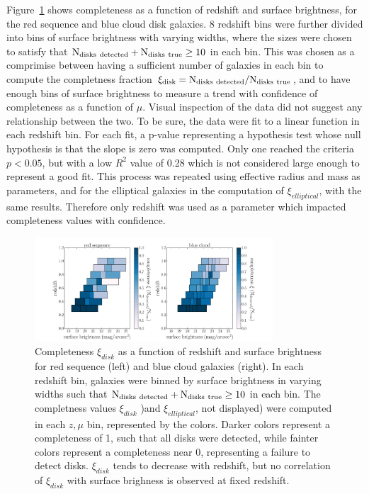 \documentclass[useAMS,usenatbib]{mn2e}
\begin{document}
Figure~\ref{fig:xi_v_sb} shows completeness as a function of redshift and surface brightness, for the red sequence and blue cloud disk galaxies. 8 redshift bins were further divided into bins of surface brightness with varying widths, where the sizes were chosen to satisfy that $\rm N_{disks~detected} + N_{disks~true} \ge 10$ in each bin. This was chosen as a comprimise between having a sufficient number of galaxies in each bin to compute the completness fraction $\rm \xi_{disk} = N_{disks~detected}/N_{disks~true}$, and to have enough bins of surface brightness to measure a trend with confidence of completeness as a function of $\mu$. Visual inspection of the data did not suggest any relationship between the two. To be sure, the data were fit to a linear function in each redshift bin. For each fit, a p-value representing a hypothesis test whose null hypothesis is that the slope is zero was computed. Only one reached the criteria $p<0.05$, but with a low $R^{2}$ value of 0.28 which is not considered large enough to represent a good fit. This process was repeated using effective radius and mass as parameters, and for the elliptical galaxies in the computation of $\xi_{elliptical}$, with the same results. Therefore only redshift was used as a parameter which impacted completeness values with confidence. 

\begin{figure}
\centering
\includegraphics[width=3.5in,trim={3cm 0cm 3cm 0cm},clip]{figures/xi_v_sb.pdf}
\caption{Completeness $\xi_{disk}$ as a function of redshift and surface brightness for red sequence (left) and blue cloud galaxies (right). In each redshift bin, galaxies were binned by surface brightness in varying widths such that $\rm N_{disks~detected} + N_{disks~true} \ge 10$ in each bin. The completness values $\xi_{disk}$ )and $\xi_{elliptical}$, not displayed) were computed in each $z,\mu$ bin, represented by the colors. Darker colors represent a completeness of 1, such that all disks were detected, while fainter colors represent a completeness near 0, representing a failure to detect disks. $\xi_{disk}$ tends to decrease with redshift, but no correlation of $\xi_{disk}$ with surface brighness is observed at fixed redshift.}
\label{fig:xi_v_sb}
\end{figure}
\end{document}
